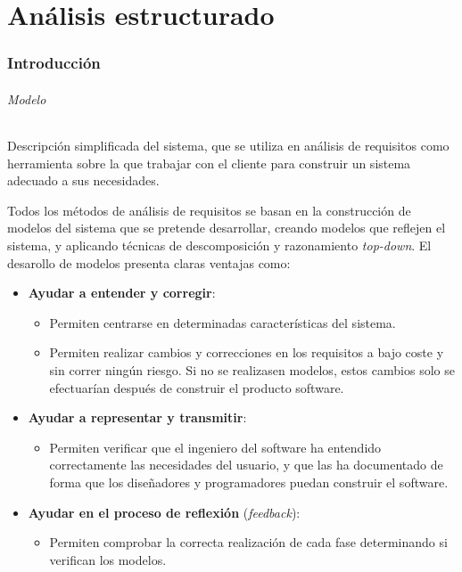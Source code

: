 \part{Análisis estructurado}

\section{Introducción}

\paragraph{Modelo} Descripción simplificada del sistema, que se utiliza en análisis de requisitos como herramienta sobre la que trabajar con el cliente para construir un sistema adecuado a sus necesidades.

Todos los métodos de análisis de requisitos se basan en la construcción de modelos del sistema que se pretende desarrollar, creando modelos que reflejen el sistema, y aplicando técnicas de descomposición y razonamiento \textit{top-down}. El desarollo de modelos presenta claras ventajas como:

\begin{itemize}
    \item \textbf{Ayudar a entender y corregir}:
    \begin{itemize}
        \item Permiten centrarse en determinadas características del sistema.
        \item Permiten realizar cambios y correcciones en los requisitos a bajo coste y sin correr ningún riesgo. Si no se realizasen modelos, estos cambios solo se efectuarían después de construir el producto software.
    \end{itemize}
    \item \textbf{Ayudar a representar y transmitir}:
    \begin{itemize}
        \item Permiten verificar que el ingeniero del software ha entendido correctamente las necesidades del usuario, y que las ha documentado de forma que los diseñadores y programadores puedan construir el software.
    \end{itemize}
    \item \textbf{Ayudar en el proceso de reflexión} (\textit{feedback}):
    \begin{itemize}
        \item Permiten comprobar la correcta realización de cada fase determinando si verifican los modelos.
    \end{itemize}
\end{itemize}

